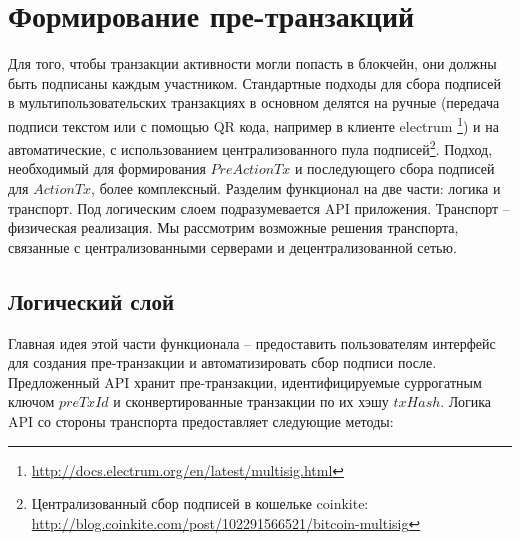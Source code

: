 \documentclass[specification,annotation]{itmo-student-thesis}
\begin{document}
\section{Формирование пре-транзакций}

Для того, чтобы транзакции активности могли попасть в блокчейн, они
должны быть подписаны каждым участником. Стандартные подходы для сбора
подписей в мультипользовательских транзакциях в основном делятся на
ручные (передача подписи текстом или с помощью QR кода, например в
клиенте
electrum \footnote{\url{http://docs.electrum.org/en/latest/multisig.html}})
и на автоматические, с использованием централизованного пула
подписей\footnote{Централизованный сбор подписей в кошельке coinkite:
  \url{http://blog.coinkite.com/post/102291566521/bitcoin-multisig}}. Подход,
необходимый для формирования $PreActionTx$ и последующего сбора
подписей для $ActionTx$, более комплексный. Разделим функционал на две
части: логика и транспорт. Под логическим слоем подразумевается API
приложения. Транспорт -- физическая реализация. Мы рассмотрим
возможные решения транспорта, связанные с централизованными серверами
и децентрализованной сетью.

\subsection{Логический слой}

Главная идея этой части функционала -- предоставить пользователям
интерфейс для создания пре-транзакции и автоматизировать сбор подписи
после. Предложенный API хранит пре-транзакции, идентифицируемые
суррогатным ключом $preTxId$ и сконвертированные транзакции по их
хэшу $txHash$. Логика API со стороны транспорта предоставляет
следующие методы:
\end{document}
